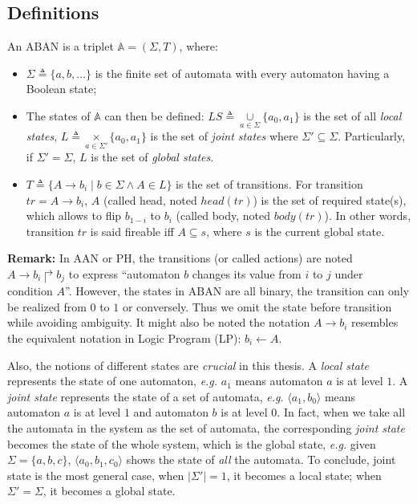 \subsection{Definitions}
\begin{definition}[ABAN]\label{def:ABAN}
An ABAN is a triplet $\mathbb{A} = (\Sigma,T)$, where:
\begin{itemize}
\item $\Sigma\triangleq\{a,b,\ldots\}$ is the finite set of automata with every automaton having a Boolean state;
\item The states of $\mathbb{A}$ can then be defined: $LS\triangleq \underset{a\in \Sigma}{\cup} \{a_0,a_1\}$ is the set of all \textit{local states}, $L\triangleq \underset{a\in \Sigma'}{\times} \{a_0,a_1\}$ is the set of \textit{joint states} where $\Sigma'\subseteq\Sigma$. Particularly, if $\Sigma'=\Sigma$, $L$ is the set of \textit{global states}. 
\item $T\triangleq \{A\rightarrow b_i\mid b\in \Sigma \land A\in L\}$ is the set of transitions.
For transition $tr=A\to b_i$, $A$ (called head, noted $head(tr)$) is the set of required state(s), which allows to flip $b_{1-i}$ to $b_i$ (called body, noted $body(tr)$). In other words, transition $tr$ is said fireable iff $A\subseteq s$, where $s$ is the current global state. 
\end{itemize}
\end{definition}

\textbf{Remark:} In AAN or PH, the transitions (or called actions) are noted $A\rightarrow b_i\Rsh b_j$ to express ``automaton $b$ changes its value from $i$ to $j$ under condition $A$''.
However, the states in ABAN are all binary, the transition can only be realized from $0$ to $1$ or conversely.
Thus we omit the state before transition while avoiding ambiguity.
It might also be noted the notation $A\rightarrow b_i$ resembles the equivalent notation in Logic Program (LP): $b_i \leftarrow A$.

Also, the notions of different states are \textit{crucial} in this thesis.
A \textit{local state} represents the state of one automaton, \textit{e.g.} $a_1$ means automaton $a$ is at level $1$.
A \textit{joint state} represents the state of a set of automata, \textit{e.g.} $\langle a_1, b_0\rangle$ means automaton $a$ is at level $1$ and automaton $b$ is at level $0$.
In fact, when we take all the automata in the system as the set of automata, the corresponding \textit{joint state} becomes the state of the whole system, which is the global state, \textit{e.g.} given $\Sigma =\{a,b,c\}$, $\langle a_0, b_1,c_0 \rangle$ shows the state of \textit{all} the automata.
To conclude, joint state is the most general case, when $|\Sigma'|=1$, it becomes a local state;
when $\Sigma'=\Sigma$, it becomes a global state.

